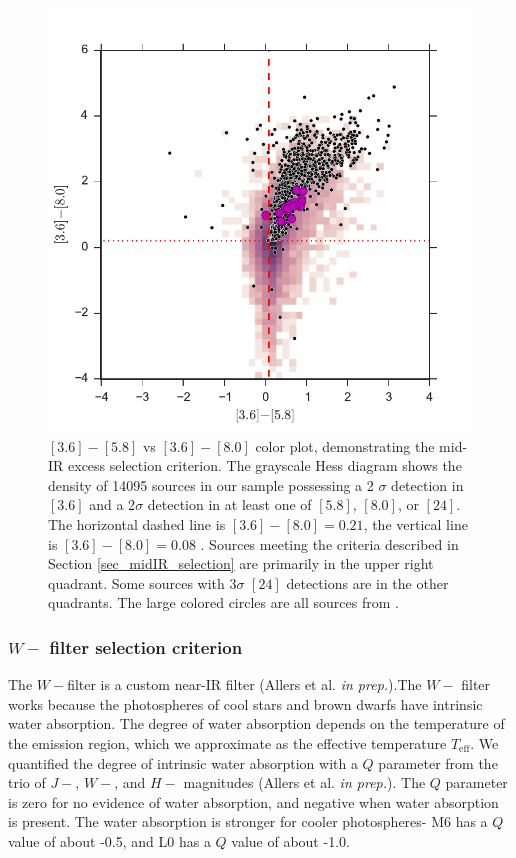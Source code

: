 \begin{figure}[ht!]
  \caption{$[3.6]-[5.8]$ vs $[3.6]-[8.0]$ color plot, demonstrating the mid-IR excess selection criterion.  The grayscale Hess diagram shows the density of 14095 sources in our sample possessing a 2 $\sigma$ detection in $[3.6]$ and a 2$\sigma$ detection in at least one of $[5.8]$, $[8.0]$, or $[24]$.  The horizontal dashed line is $[3.6]-[8.0]=0.21$, the vertical line is $[3.6]-[8.0]=0.08$ \citep{2006ApJ...651..502P}.  Sources meeting the criteria described in Section \ref{sec_midIR_selection} are primarily in the upper right quadrant.  Some sources with 3$\sigma$ $[24]$ detections are in the other quadrants.  The large colored circles are all sources from \citet{allers06}. \label{fig_midIR_selection}}
\centering
\includegraphics[scale=0.6]{chIMACS/figures/disk_selection_allers}
\end{figure}

\subsubsection{$W-$ filter selection criterion}
The $W-$filter is a custom near-IR filter (Allers et al. \emph{in prep.}).The $W-$ filter works because the photospheres of cool stars and brown dwarfs have intrinsic water absorption.  The degree of water absorption depends on the temperature of the emission region, which we approximate as the effective temperature $T_{\mathrm{eff}}$.  We  quantified the degree of intrinsic water absorption with a $Q$ parameter from the trio of $J-$, $W-$, and $H-$ magnitudes (Allers et al. \emph{in prep.}).  The $Q$ parameter is zero for no evidence of water absorption, and negative when water absorption is present.  The water absorption is stronger for cooler photospheres- M6 has a $Q$ value of about -0.5, and L0 has a $Q$ value of about -1.0.  

